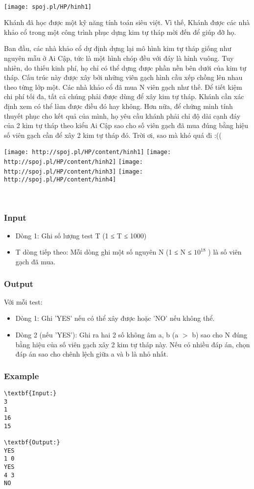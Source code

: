 

 


\texttt{[image: spoj.pl/HP/hinh1]}

Khánh đã học được một kỹ năng tính toán siêu việt. Vì thế, Khánh được các nhà khảo cổ trong một công trình phục dựng kim tự tháp mời đến để giúp đỡ họ.

Ban đầu, các nhà khảo cổ dự định dựng lại mô hình kim tự tháp giống như nguyên mẫu ở Ai Cập, tức là một hình chóp đều với đáy là hình vuông. Tuy nhiên, do thiếu kinh phí, họ chỉ có thể dựng được phần nền bên dưới của kim tự tháp. Cấu trúc này được xây bởi những viên gạch hình cầu xếp chồng lên nhau theo từng lớp một. Các nhà khảo cổ đã mua N viên gạch như thế. Để tiết kiệm chi phí tối đa, tất cả chúng phải được dùng để xây kim tự tháp. Khánh cần xác định xem có thể làm được điều đó hay không. Hơn nữa, để chứng minh tính thuyết phục cho kết quả của mình, họ yêu cầu khánh phải chỉ độ dài cạnh đáy của 2 kim tự tháp theo kiểu Ai Cập sao cho số viên gạch đã mua đúng bằng hiệu số viên gạch cần để xây 2 kim tự tháp đó. Trời ơi, sao mà khó quá đi :((


\texttt{[image: http://spoj.pl/HP/content/hinh1]}
\texttt{[image: http://spoj.pl/HP/content/hinh2]}
\texttt{[image: http://spoj.pl/HP/content/hinh3]}
\texttt{[image: http://spoj.pl/HP/content/hinh4]}

 

\subsubsection{Input}
\begin{itemize}
	\item Dòng 1: Ghi số lượng test T (1 ≤ T ≤ 1000)
	\item T dòng tiếp theo: Mỗi dòng ghi một số nguyên N (1 ≤ N ≤ $10^{18}$ ) là số viên gạch đã mua.
\end{itemize}

\subsubsection{Output}

Với mỗi test:
\begin{itemize}
	\item Dòng 1: Ghi 'YES' nếu có thể xây được hoặc 'NO' nếu không thể.
	\item Dòng 2 (nếu 'YES'): Ghi ra hai 2 số không âm a, b (a $>$ b) sao cho N đúng bằng hiệu của số viên gạch xây 2 kim tự tháp này. Nếu có nhiều đáp án, chọn đáp án sao cho chênh lệch giữa a và b là nhỏ nhất.
\end{itemize}

\subsubsection{Example}
\begin{verbatim}
\textbf{Input:}
3
1
16
15

\textbf{Output:}
YES
1 0
YES
4 3
NO
\end{verbatim}
